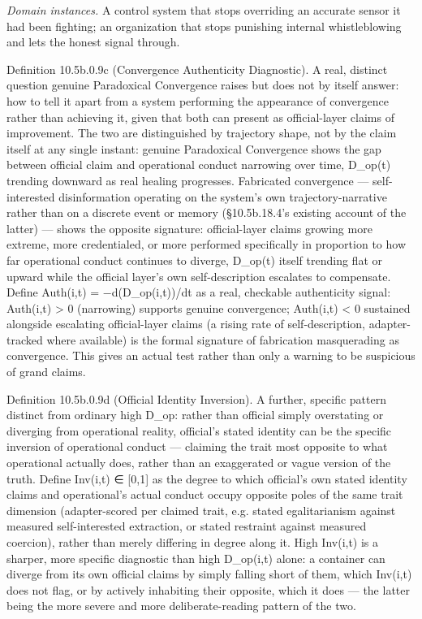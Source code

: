\documentclass[
]{article}
\begin{document}
\emph{Domain instances.} A control system that stops overriding an
accurate sensor it had been fighting; an organization that stops
punishing internal whistleblowing and lets the honest signal through.

Definition 10.5b.0.9c (Convergence Authenticity Diagnostic). A real,
distinct question genuine Paradoxical Convergence raises but does not by
itself answer: how to tell it apart from a system performing the
appearance of convergence rather than achieving it, given that both can
present as official-layer claims of improvement. The two are
distinguished by trajectory shape, not by the claim itself at any single
instant: genuine Paradoxical Convergence shows the gap between official
claim and operational conduct narrowing over time, D\_op(t) trending
downward as real healing progresses. Fabricated convergence ---
self-interested disinformation operating on the system's own
trajectory-narrative rather than on a discrete event or memory
(§10.5b.18.4's existing account of the latter) --- shows the opposite
signature: official-layer claims growing more extreme, more
credentialed, or more performed specifically in proportion to how far
operational conduct continues to diverge, D\_op(t) itself trending flat
or upward while the official layer's own self-description escalates to
compensate. Define Auth(i,t) = −d(D\_op(i,t))/dt as a real, checkable
authenticity signal: Auth(i,t) \textgreater{} 0 (narrowing) supports
genuine convergence; Auth(i,t) \textless{} 0 sustained alongside
escalating official-layer claims (a rising rate of self-description,
adapter-tracked where available) is the formal signature of fabrication
masquerading as convergence. This gives an actual test rather than only
a warning to be suspicious of grand claims.

Definition 10.5b.0.9d (Official Identity Inversion). A further, specific
pattern distinct from ordinary high D\_op: rather than official simply
overstating or diverging from operational reality, official's stated
identity can be the specific inversion of operational conduct ---
claiming the trait most opposite to what operational actually does,
rather than an exaggerated or vague version of the truth. Define
Inv(i,t) ∈ {[}0,1{]} as the degree to which official's own stated
identity claims and operational's actual conduct occupy opposite poles
of the same trait dimension (adapter-scored per claimed trait, e.g.
stated egalitarianism against measured self-interested extraction, or
stated restraint against measured coercion), rather than merely
differing in degree along it. High Inv(i,t) is a sharper, more specific
diagnostic than high D\_op(i,t) alone: a container can diverge from its
own official claims by simply falling short of them, which Inv(i,t) does
not flag, or by actively inhabiting their opposite, which it does ---
the latter being the more severe and more deliberate-reading pattern of
the two.
\end{document}
